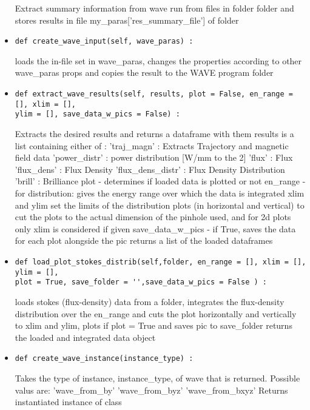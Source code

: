 \documentclass[
12pt,%
a4paper,  %
twoside        %
]{report}
\begin{document}
\begin{landscape}
\begin{itemize}
\begin{verbatim}
\end{verbatim}
Extract summary information from wave run from files in folder folder and stores results in file my\_paras['res\_summary\_file']
of folder
\item \begin{verbatim}
def create_wave_input(self, wave_paras) :
\end{verbatim}
loads the in-file set in wave\_paras,
changes the properties according to other wave\_paras props and 
copies the result to the WAVE program folder
\item \begin{verbatim}
def extract_wave_results(self, results, plot = False, en_range = [], xlim = [],
ylim = [], save_data_w_pics = False) :
\end{verbatim}
Extracts the desired results and returns a dataframe with them
results is a list containing either of : 
'traj\_magn' : Extracts Trajectory and magnetic field data
'power\_distr' : power distribution [W/mm to the 2]
'flux' : Flux
'flux\_dens' : Flux Density
'flux\_dens\_distr' : Flux Density Distribution
'brill' : Brilliance
plot - determines if loaded data is plotted or not
en\_range - for distribution: gives the energy range over which the data is integrated
xlim and ylim set the limits of the distribution plots (in horizontal and vertical) to cut 
the plots to the actual dimension of the pinhole used, and for 2d plots only xlim is 
considered if given
save\_data\_w\_pics - if True, saves the data for each plot alongside the pic
returns a list of the loaded dataframes
\item \begin{verbatim}
def load_plot_stokes_distrib(self,folder, en_range = [], xlim = [], ylim = [],
plot = True, save_folder = '',save_data_w_pics = False ) :
\end{verbatim}
loads stokes (flux-density) data from a folder, integrates the flux-density distribution over the en\_range 
and cuts the plot horizontally and vertically to xlim and ylim, plots if plot = True and saves pic to save\_folder
returns the loaded and integrated data object
\item \begin{verbatim}
def create_wave_instance(instance_type) :
\end{verbatim}
Takes the type of instance, instance\_type, of wave that is returned. Possible valus are:
'wave\_from\_by'
'wave\_from\_byz'
'wave\_from\_bxyz'
Returns instantiated instance of class
\end{itemize}

\end{landscape}
\end{document}
